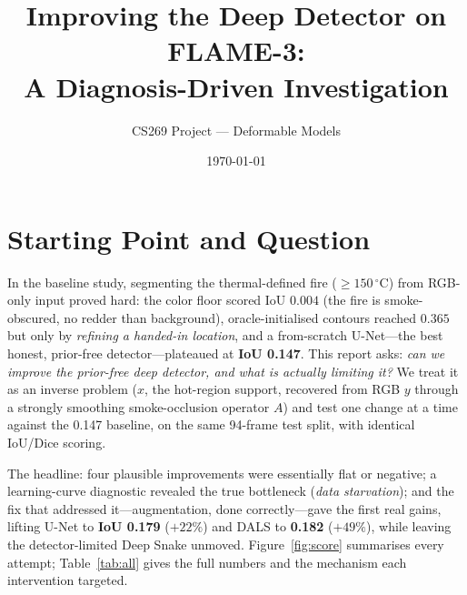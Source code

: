 \documentclass[10pt]{article}
\title{\vspace{-2.5em}Improving the Deep Detector on FLAME-3:\\
A Diagnosis-Driven Investigation}
\author{CS269 Project --- Deformable Models}
\date{\today}
\begin{document}
\maketitle
\vspace{-1.5em}

\section{Starting Point and Question}

In the baseline study, segmenting the thermal-defined fire ($\ge150\,^\circ$C) from
RGB-only input proved hard: the color floor scored IoU $0.004$ (the fire is
smoke-obscured, no redder than background), oracle-initialised contours reached
$0.365$ but only by \emph{refining a handed-in location}, and a from-scratch
U-Net---the best honest, prior-free detector---plateaued at \textbf{IoU 0.147}.
This report asks: \emph{can we improve the prior-free deep detector, and what is
actually limiting it?} We treat it as an inverse problem ($x$, the hot-region
support, recovered from RGB $y$ through a strongly smoothing smoke-occlusion
operator $A$) and test one change at a time against the 0.147 baseline, on the
same 94-frame test split, with identical IoU/Dice scoring.

The headline: four plausible improvements were essentially flat or negative; a
learning-curve diagnostic revealed the true bottleneck (\emph{data starvation});
and the fix that addressed it---augmentation, done correctly---gave the first
real gains, lifting U-Net to \textbf{IoU 0.179} ($+22\%$) and DALS to
\textbf{0.182} ($+49\%$), while leaving the detector-limited Deep Snake unmoved.
Figure~\ref{fig:score}
summarises every attempt; Table~\ref{tab:all} gives the full numbers and the
mechanism each intervention targeted.
\end{document}
